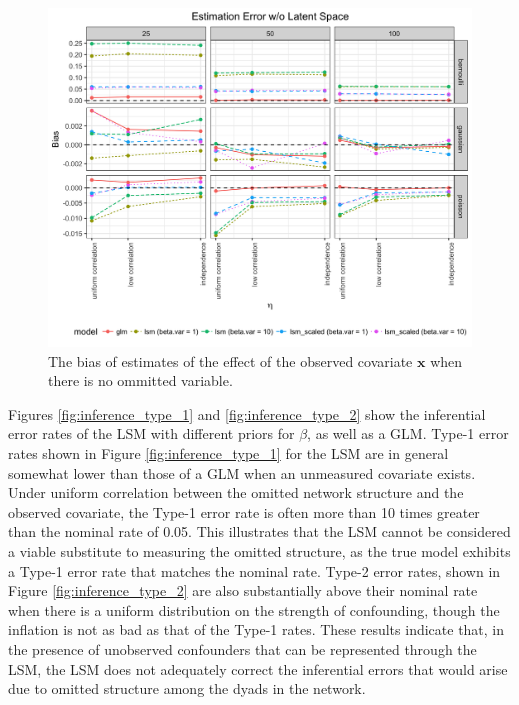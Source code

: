 \documentclass[11pt]{article}
\begin{document}
\begin{figure}
\includegraphics[width=\textwidth]{figures/estimation_nls.png}
\caption{The bias of estimates of the effect of the observed covariate $\mathbf{x}$ when there is no ommitted variable.
\label{fig:estimation_nls}}
\end{figure}

Figures \ref{fig:inference_type_1} and \ref{fig:inference_type_2} show the inferential error rates of the LSM with different priors for $\beta$, as well as a GLM. Type-1 error rates shown in Figure \ref{fig:inference_type_1} for the LSM are in general somewhat lower than those of a GLM when an unmeasured covariate exists. Under uniform correlation between the omitted network structure and the observed covariate, the Type-1 error rate is often more than 10 times greater than the nominal rate of 0.05. This illustrates that the LSM cannot be considered a viable substitute to measuring the omitted structure, as the true model exhibits a Type-1 error rate that matches the nominal rate. Type-2 error rates, shown in Figure \ref{fig:inference_type_2} are also substantially above their nominal rate when there is a uniform distribution on the strength of confounding, though the inflation is not as bad as that of the Type-1 rates. These results indicate that, in the presence of unobserved confounders that can be represented through the LSM, the LSM does not adequately correct the inferential errors that would arise due to omitted structure among the dyads in the network.
\end{document}
